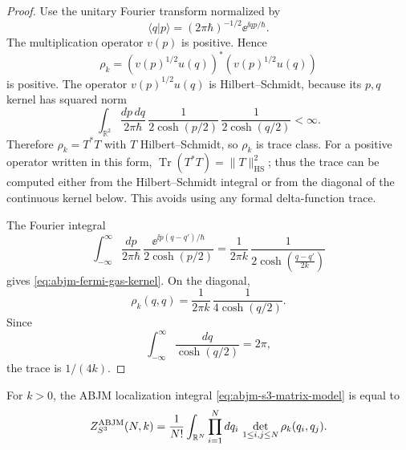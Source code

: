 \begin{proof}
Use the unitary Fourier transform normalized by
\[
  \langle q|p\rangle=(2\pi\hbar)^{-1/2}\ee^{\ii qp/\hbar}.
\]
The multiplication operator \(v(p)\) is positive.  Hence
\[
  \rho_k
  =
  \left(v(p)^{1/2}u(q)\right)^*
  \left(v(p)^{1/2}u(q)\right)
\]
is positive.  The operator \(v(p)^{1/2}u(q)\) is Hilbert--Schmidt, because
its \(p,q\) kernel has squared norm
\[
  \int_{\mathbb R^2}\frac{dp\,dq}{2\pi\hbar}\,
  \frac1{2\cosh(p/2)}\,\frac1{2\cosh(q/2)}
  <\infty .
\]
Therefore \(\rho_k=T^*T\) with \(T\) Hilbert--Schmidt, so \(\rho_k\) is
trace class.
For a positive operator written in this form,
\(\operatorname{Tr}(T^*T)=\|T\|_{\mathrm{HS}}^2\); thus the trace can be
computed either from the Hilbert--Schmidt integral or from the diagonal of the
continuous kernel below.  This avoids using any formal delta-function trace.

The Fourier integral
\[
  \int_{-\infty}^{\infty}
  \frac{dp}{2\pi\hbar}\,
  \frac{\ee^{\ii p(q-q')/\hbar}}{2\cosh(p/2)}
  =
  \frac1{2\pi k}\,
  \frac1{2\cosh\!\left(\frac{q-q'}{2k}\right)}
\]
gives \eqref{eq:abjm-fermi-gas-kernel}.  On the diagonal,
\[
  \rho_k(q,q)
  =
  \frac1{2\pi k}\,
  \frac1{4\cosh(q/2)} .
\]
Since
\[
  \int_{-\infty}^{\infty}\frac{dq}{\cosh(q/2)}=2\pi,
\]
the trace is \(1/(4k)\).
\end{proof}

\begin{quotedtheorem}
\label{qt:abjm-fermi-gas-representation}
For \(k>0\), the ABJM localization integral
\eqref{eq:abjm-s3-matrix-model} is equal to
\begin{equation}
  Z^{\rm ABJM}_{S^3}(N,k)
  =
  \frac1{N!}\int_{\mathbb R^N}\prod_{i=1}^N dq_i\,
  \det_{1\le i,j\le N}\rho_k(q_i,q_j).
  \label{eq:abjm-canonical-fermi-gas}
\end{equation}
\end{quotedtheorem}

